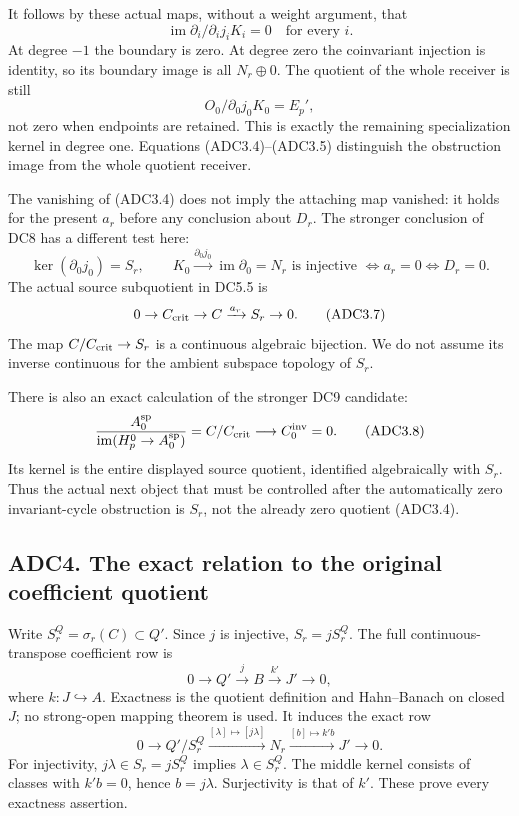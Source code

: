 It follows by these actual maps, without a weight argument, that \[
\boxed{\operatorname{im}\partial_i/\partial_i j_iK_i=0
\quad\text{for every }i.}
\tag{ADC3.4}
\] At degree \(-1\) the boundary is zero. At degree zero the coinvariant
injection is identity, so its boundary image is all \(N_r\oplus0\). The
quotient of the whole receiver is still \[
O_0/\partial_0j_0K_0=E_p',
\tag{ADC3.5}
\] not zero when endpoints are retained. This is exactly the remaining
specialization kernel in degree one. Equations (ADC3.4)--(ADC3.5)
distinguish the obstruction image from the whole quotient receiver.

The vanishing of (ADC3.4) does not imply the attaching map vanished: it
holds for the present \(a_r\) before any conclusion about \(D_r\). The
stronger conclusion of DC8 has a different test here: \[
\ker(\partial_0j_0)=S_r,\qquad
K_0\xrightarrow{\partial_0j_0}\operatorname{im}\partial_0=N_r
\text{ is injective }\Longleftrightarrow a_r=0
\Longleftrightarrow D_r=0.
\tag{ADC3.6}
\] The actual source subquotient in DC5.5 is \[
0\to C_{\rm crit}\to C\xrightarrow{a_r}S_r\to0.
\tag{ADC3.7}
\] The map \(C/C_{\rm crit}\to S_r\) is a continuous algebraic
bijection. We do not assume its inverse continuous for the ambient
subspace topology of \(S_r\).

There is also an exact calculation of the stronger DC9 candidate: \[
\frac{A_0^{\rm sp}}{\operatorname{im}(H^0_p\to A_0^{\rm sp})}
=C/C_{\rm crit}\longrightarrow C_0^{\rm inv}=0.
\tag{ADC3.8}
\] Its kernel is the entire displayed source quotient, identified
algebraically with \(S_r\). Thus the actual next object that must be
controlled after the automatically zero invariant-cycle obstruction is
\(S_r\), not the already zero quotient (ADC3.4).

\subsection{ADC4. The exact relation to the original coefficient
quotient}\label{adc4.-the-exact-relation-to-the-original-coefficient-quotient}

Write \(S_r^Q=\sigma_r(C)\subset Q'\). Since \(j\) is injective,
\(S_r=jS_r^Q\). The full continuous-transpose coefficient row is \[
0\to Q'\xrightarrow jB\xrightarrow{k'}J'\to0,
\tag{ADC4.1}
\] where \(k:J\hookrightarrow A\). Exactness is the quotient definition
and Hahn--Banach on closed \(J\); no strong-open mapping theorem is
used. It induces the exact row \[
0\to Q'/S_r^Q\xrightarrow{[\lambda]\mapsto[j\lambda]}
N_r\xrightarrow{[b]\mapsto k'b}J'\to0.
\tag{ADC4.2}
\] For injectivity, \(j\lambda\in S_r=jS_r^Q\) implies
\(\lambda\in S_r^Q\). The middle kernel consists of classes with
\(k'b=0\), hence \(b=j\lambda\). Surjectivity is that of \(k'\). These
prove every exactness assertion.

